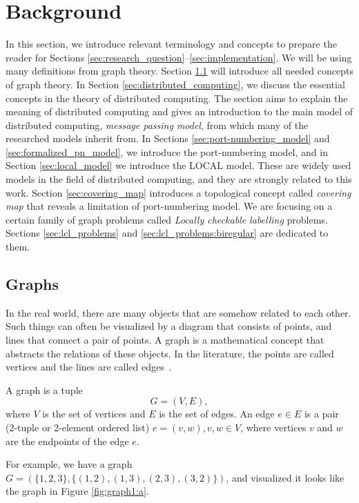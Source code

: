
\section{Background} \label{sec:background}
In this section, we introduce relevant terminology and concepts to prepare the reader for Sections \ref{sec:research_question}--\ref{sec:implementation}.
%
We will be using many definitions from graph theory.
Section \ref{sec:graphs} will introduce all needed concepts of graph theory.
%
In Section \ref{sec:distributed_computing}, we discuss the essential concepts in the theory of distributed computing.
The section aims to explain the meaning of distributed computing and gives an introduction to the main model of distributed computing, \emph{message passing model}, from which many of the researched models inherit from.
%
In Sections \ref{sec:port-numbering_model} and \ref{sec:formalized_pn_model}, we introduce the port-numbering model, and in Section \ref{sec:local_model} we introduce the LOCAL model.
These are widely used models in the field of distributed computing, and they are strongly related to this work.
%
Section \ref{sec:covering_map} introduces a topological concept called \emph{covering map} that reveals a limitation of port-numbering model.
%
We are focusing on a certain family of graph problems called \emph{Locally checkable labelling} problems.
Sections \ref{sec:lcl_problems} and \ref{sec:lcl_problems:biregular} are dedicated to them.


\subsection{Graphs} \label{sec:graphs}
In the real world, there are many objects that are somehow related to each other.
Such things can often be visualized by a diagram that consists of points, and lines that connect a pair of points.
A graph is a mathematical concept that abstracts the relations of these objects.
In the literature, the points are called vertices and the lines are called edges~\cite{DBLP:books/others/BondyM76}.

\begin{definition}
A graph is a tuple \[  G = (V, E), \] where $V$ is the set of vertices and $E$ is the set of edges.
An edge $e \in E$ is a pair (2-tuple or 2-element ordered list) $e=(v, w), v, w \in V$, where vertices $v$ and $w$ are the endpoints of the edge $e$.
\end{definition}
For example, we have a graph $G=(\{1, 2, 3\}, \{(1, 2),(1, 3),(2, 3),(3, 2)\})$, and visualized it looks like the graph in Figure \ref{fig:graph1:a}.

